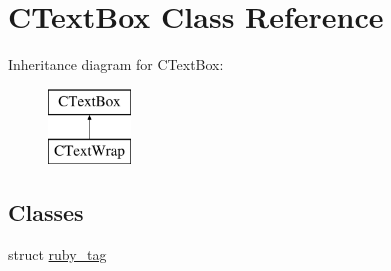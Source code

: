 \hypertarget{class_c_text_box}{}\section{C\+Text\+Box Class Reference}
\label{class_c_text_box}
Inheritance diagram for C\+Text\+Box\+:\begin{figure}[H]
\begin{center}
\leavevmode
\includegraphics[height=2.000000cm]{class_c_text_box}
\end{center}
\end{figure}
\subsection*{Classes}
\begin{DoxyCompactItemize}
\item 
struct \hyperlink{struct_c_text_box_1_1ruby__tag}{ruby\+\_\+tag}
\end{DoxyCompactItemize}
